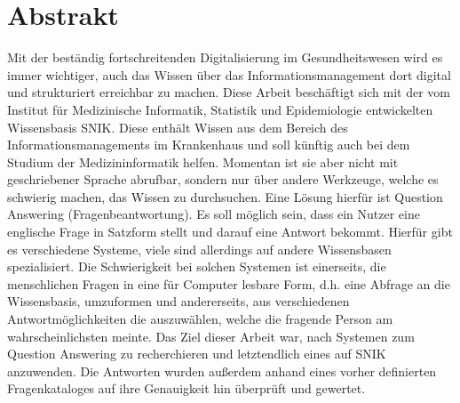 \chapter*{Abstrakt}
Mit der beständig fortschreitenden Digitalisierung im Gesundheitswesen wird es immer wichtiger, auch das Wissen über das Informationsmanagement dort digital und strukturiert erreichbar zu machen.
Diese Arbeit beschäftigt sich mit der vom Institut für Medizinische Informatik, Statistik und Epidemiologie entwickelten Wissensbasis SNIK.
Diese enthält Wissen aus dem Bereich des Informationsmanagements im Krankenhaus und soll künftig auch bei dem Studium der Medizininformatik helfen.
Momentan ist sie aber nicht mit geschriebener Sprache abrufbar, sondern nur über andere Werkzeuge, welche es schwierig machen, das Wissen zu durchsuchen.
Eine Lösung hierfür ist Question Answering (Fragenbeantwortung).
Es soll möglich sein, dass ein Nutzer eine englische Frage in Satzform stellt und darauf eine Antwort bekommt.
Hierfür gibt es verschiedene Systeme, viele sind allerdings auf andere Wissensbasen spezialisiert.
Die Schwierigkeit bei solchen Systemen ist einerseits, die menschlichen Fragen in eine für Computer lesbare Form, d.h. eine Abfrage an die Wissensbasis,
umzuformen und andererseits, aus verschiedenen Antwortmöglichkeiten die auszuwählen, welche die fragende Person am wahrscheinlichsten meinte.
Das Ziel dieser Arbeit war, nach Systemen zum Question Answering zu recherchieren und letztendlich eines auf SNIK anzuwenden.
Die Antworten wurden außerdem anhand eines vorher definierten Fragenkataloges auf ihre Genauigkeit hin überprüft und gewertet.
\vfill
